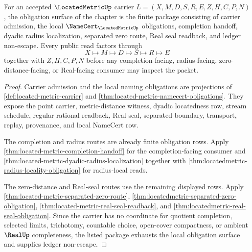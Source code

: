 \begin{theorem}
\label{thm:locatedmetric-obligation-closure-package}
For an accepted $\LocatedMetricUp$ carrier $L=(X,M,D,S,R,E,Z,H,C,P,N)$, the obligation surface of the chapter is the finite package consisting of carrier admission, the local $\NameCert_{\LocatedMetricUp}$ obligations, completion handoff, dyadic radius localization, separated zero route, Real seal readback, and ledger non-escape. Every public read factors through
$$
X\longmapsto M\longmapsto D\longmapsto S\longmapsto R\longmapsto E
$$
together with $Z,H,C,P,N$ before any completion-facing, radius-facing, zero-distance-facing, or Real-facing consumer may inspect the packet.
\end{theorem}
\begin{proof}
Carrier admission and the local naming obligations are projections of \autoref{def:located-metric-carrier} and \autoref{thm:located-metric-namecert-obligations}. They expose the point carrier, metric-distance witness, dyadic locatedness row, stream schedule, regular rational readback, Real seal, separated boundary, transport, replay, provenance, and local NameCert row.

The completion and radius routes are already finite obligation rows. Apply \autoref{thm:located-metric-completion-handoff} for the completion-facing consumer and \autoref{thm:located-metric-dyadic-radius-localization} together with \autoref{thm:locatedmetric-radius-locality-obligation} for radius-local reads.

The zero-distance and Real-seal routes use the remaining displayed rows. Apply \autoref{thm:located-metric-separated-zero-route}, \autoref{thm:locatedmetric-separated-zero-obligation}, \autoref{thm:located-metric-real-seal-readback}, and \autoref{thm:locatedmetric-real-seal-obligation}. Since the carrier has no coordinate for quotient completion, selected limits, trichotomy, countable choice, open-cover compactness, or ambient $\RealUp$ completeness, the listed package exhausts the local obligation surface and supplies ledger non-escape.
\end{proof}

